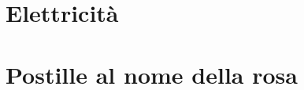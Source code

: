 \documentclass[a4paper, 11pt, twoside, openright, italian]{memoir}
\begin{document}
\frontmatter




\mainmatter

\part{Elettricità}



%
%
%
%
%
%
\part{Postille al nome della rosa}

%
%
%
%
%
%
\end{document}
